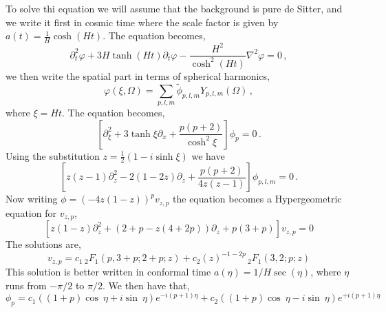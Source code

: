 \documentclass[a4paper,11pt]{article}
\numberwithin{equation}{section}
\numberwithin{equation}{section}
\begin{document}
To solve thi equation we will assume that the background is pure de Sitter, and we write it first in cosmic time where the scale factor is given  by  $a(t)=\frac{1}{H}\cosh (H t)$. The equation  becomes,
\begin{equation}
\partial^2_t\varphi+3H \tanh(H t)\partial_t\varphi-\frac{H^2}{\cosh^2(Ht)}\nabla^2\varphi=0 \,,
\end{equation}
 we then write the spatial part in terms of spherical harmonics,
\begin{equation}
\varphi(\xi,\Omega)=\sum_{p, l, m}\tilde\phi_{p, l, m} Y_{p, l, m}(\Omega) \,,
\end{equation}
where $\xi=H t$. The equation becomes,
\begin{equation}
\left[\partial_\xi^2+3\tanh\xi\partial_x+\frac{p(p+2)}{\cosh^2\xi}\right]\phi_p=0 \,.
\end{equation}
Using the substitution $z= \frac{1}{2}\left(1-i\sinh \xi\right)$ we have
\begin{equation}
\left[z(z-1)\partial^2_z-2(1-2z)\partial_z+\frac{p(p+2)}{4z(z-1)}\right]\phi_{p, l, m}=0 \,.
\end{equation}
Now writing $\phi=(-4z(1-z))^p v_{z,p}$ the equation becomes a Hypergeometric equation for $v_{z,p}$,
\begin{equation}
\left[z(1-z)\partial^2_z+(2+p-z(4+2p))\partial_z +p(3+p)\right]v_{z,p}=0
\end{equation}
The solutions are,
\begin{equation}
v_{z,p}=c_1 \,  _2F_1(p,3+p;2+p;z)+c_2(z)^{-1-2p} \, _2F_1(3,2;p;z)
\end{equation}
This solution is better  written in conformal time $a(\eta)=1/H \sec(\eta)$, where $\eta$ runs from $-\pi/2$ to $\pi/2$. We then have that,
\begin{equation}
\phi_{p}=c_1((1+p)\cos\ \eta+i\sin\ \eta )e^{-i(p+1)\eta}+c_2 ((1+p)\cos\ \eta-i\sin\ \eta )e^{+i(p+1)\eta}
\end{equation}
\end{document}
